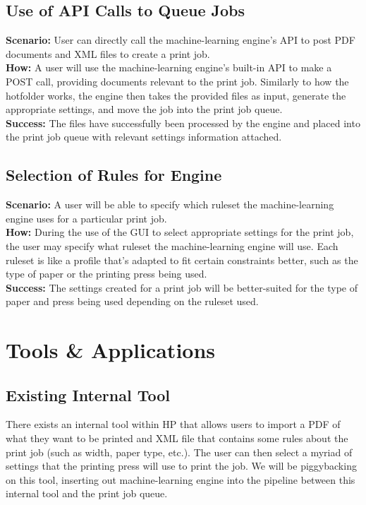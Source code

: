 \documentclass[onecolumn, draftclsnofoot,10pt, compsoc]{IEEEtran}
\begin{document}
\subsection{Use of API Calls to Queue Jobs}
\textbf{Scenario:} User can directly call the machine-learning engine's API to post PDF documents and XML files to create a print job.\\
\textbf{How:} A user will use the machine-learning engine's built-in API to make a POST call, providing documents relevant to the print job. Similarly to how the hotfolder works, the engine then takes the provided files as input, generate the appropriate settings, and move the job into the print job queue.\\
\textbf{Success:} The files have successfully been processed by the engine and placed into the print job queue with relevant settings information attached.

\subsection{Selection of Rules for Engine}
\textbf{Scenario:} A user will be able to specify which ruleset the machine-learning engine uses for a particular print job.\\
\textbf{How:} During the use of the GUI to select appropriate settings for the print job, the user may specify what ruleset the machine-learning engine will use. Each ruleset is like a profile that's adapted to fit certain constraints better, such as the type of paper or the printing press being used.\\
\textbf{Success:} The settings created for a print job will be better-suited for the type of paper and press being used depending on the ruleset used.

\section{Tools \& Applications}
\subsection{Existing Internal Tool}
There exists an internal tool within HP that allows users to import a PDF of what they want to be printed and XML file that contains some rules about the print job (such as width, paper type, etc.). The user can then select a myriad of settings that the printing press will use to print the job. We will be piggybacking on this tool, inserting out machine-learning engine into the pipeline between this internal tool and the print job queue.
\end{document}
